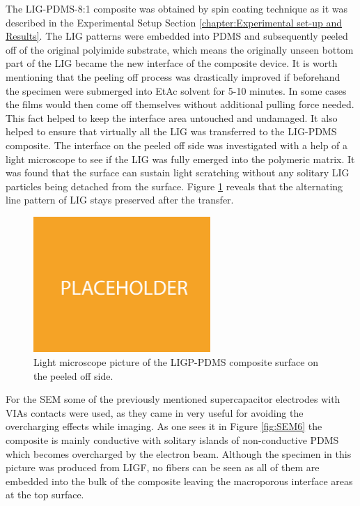 The LIG-PDMS-8:1 composite was obtained by spin coating technique as it was described in the Experimental Setup Section \ref{chapter:Experimental set-up and Results}. The LIG patterns were embedded into PDMS and subsequently peeled off of the original polyimide substrate, which means the originally unseen bottom part of the LIG became the new interface of the composite device. It is worth mentioning that the peeling off process was drastically improved if beforehand the specimen were submerged into EtAc solvent for 5-10 minutes. In some cases the films would then come off themselves without additional pulling force needed. This fact helped to keep the interface area untouched and undamaged. It also helped to ensure that virtually all the LIG was transferred to the LIG-PDMS composite. The interface on the peeled off side was investigated with a help of a light microscope to see if the LIG was fully emerged into the polymeric matrix. It was found that the surface can sustain light scratching without any solitary LIG particles being detached from the surface. Figure \ref{fig:LIG-PDMS-LM} reveals that the alternating line pattern of LIG stays preserved after the transfer.

\begin{figure}[H]
\centering
\includegraphics[width=0.6\textwidth]{Figures/Placeholder.jpg}
\medskip
\captionsetup{width=0.6\linewidth}
\caption{Light microscope picture of the LIGP-PDMS composite surface on the peeled off side.}
\label{fig:LIG-PDMS-LM}
\end{figure}

For the SEM some of the previously mentioned supercapacitor electrodes with VIAs contacts were used, as they came in very useful for avoiding the overcharging effects while imaging. As one sees it in Figure \ref{fig:SEM6} the composite is mainly conductive with solitary islands of non-conductive PDMS which becomes overcharged by the electron beam. Although the specimen in this picture was produced from LIGF, no fibers can be seen as all of them are embedded into the bulk of the composite leaving the macroporous interface areas at the top surface. 

